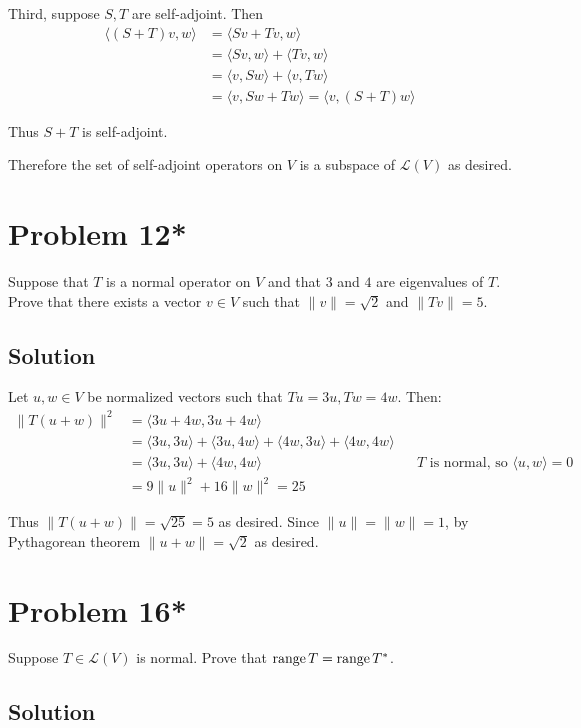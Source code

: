 \documentclass{article}
\begin{document}
Third, suppose $S, T$ are self-adjoint. Then
\begin{align*}
\langle (S+T)v, w\rangle&=\langle Sv + Tv, w\rangle\\
&=\langle Sv,w\rangle+\langle Tv,w\rangle\\
&=\langle v,Sw\rangle+\langle v,Tw\rangle\\
&=\langle v, Sw+Tw\rangle=\langle v, (S+T)w\rangle    
\end{align*}

Thus $S+T$ is self-adjoint.

\vs

Therefore the set of self-adjoint operators on $V$ is a subspace of $\mathcal{L}(V)$ as desired.

\section*{Problem 12*}
Suppose that $T$ is a normal operator on $V$ and that $3$ and $4$ are eigenvalues of $T$. Prove that there exists a vector $v\in V$ such that $\|v\|=\sqrt{2}$ and $\|Tv\|=5$.

\subsection*{Solution}
Let $u,w\in V$ be normalized vectors such that $Tu=3u, Tw=4w$. Then:
\begin{align*}
\|T(u+w)\|^2&=\langle 3u+4w, 3u+4w\rangle\\
&=\langle 3u, 3u\rangle+\langle 3u,4w\rangle+\langle 4w,3u\rangle+\langle 4w,4w\rangle\\
&=\langle 3u, 3u\rangle+\langle 4w,4w\rangle&&\text{$T$ is normal, so $\langle u,w\rangle=0$}\\
&=9\|u\|^2+16\|w\|^2=25
\end{align*}

Thus $\|T(u+w)\|=\sqrt{25}=5$ as desired. Since $\|u\|=\|w\|=1$, by Pythagorean theorem $\|u+w\|=\sqrt{2}$ as desired.

\section*{Problem 16*}
Suppose $T\in\mathcal{L}(V)$ is normal. Prove that $\text{range}\, T=\text{range}\, T^*$.

\subsection*{Solution}
\end{document}
